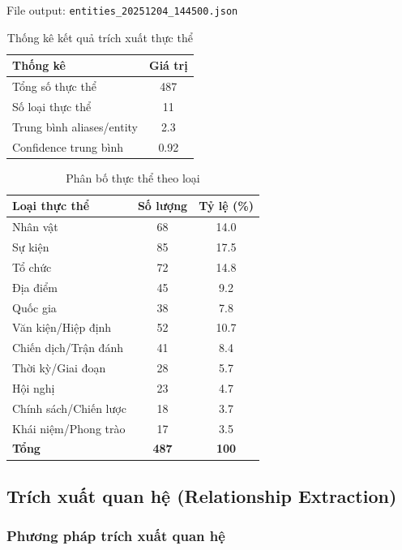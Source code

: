 File output: \texttt{entities\_20251204\_144500.json}

\begin{table}[H]
\centering
\caption{Thống kê kết quả trích xuất thực thể}
\label{tab:entity-stats}
\begin{tabular}{|l|c|}
\hline
\textbf{Thống kê} & \textbf{Giá trị} \\
\hline
Tổng số thực thể & 487 \\
Số loại thực thể & 11 \\
Trung bình aliases/entity & 2.3 \\
Confidence trung bình & 0.92 \\
\hline
\end{tabular}
\end{table}

\begin{table}[H]
\centering
\caption{Phân bố thực thể theo loại}
\label{tab:entity-distribution}
\begin{tabular}{|l|c|c|}
\hline
\textbf{Loại thực thể} & \textbf{Số lượng} & \textbf{Tỷ lệ (\%)} \\
\hline
Nhân vật & 68 & 14.0 \\
Sự kiện & 85 & 17.5 \\
Tổ chức & 72 & 14.8 \\
Địa điểm & 45 & 9.2 \\
Quốc gia & 38 & 7.8 \\
Văn kiện/Hiệp định & 52 & 10.7 \\
Chiến dịch/Trận đánh & 41 & 8.4 \\
Thời kỳ/Giai đoạn & 28 & 5.7 \\
Hội nghị & 23 & 4.7 \\
Chính sách/Chiến lược & 18 & 3.7 \\
Khái niệm/Phong trào & 17 & 3.5 \\
\hline
\textbf{Tổng} & \textbf{487} & \textbf{100} \\
\hline
\end{tabular}
\end{table}

\subsection{Trích xuất quan hệ (Relationship Extraction)}

\subsubsection{Phương pháp trích xuất quan hệ}


